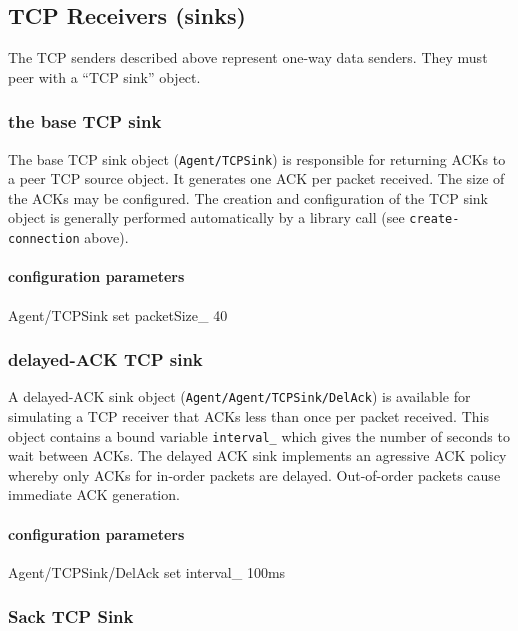 \documentclass{article}
\begin{document}
\subsection{TCP Receivers (sinks)}

The TCP senders described above represent one-way data senders.
They must peer with a ``TCP sink'' object.

\subsubsection{the base TCP sink}

The base TCP sink object ({\tt Agent/TCPSink})
is responsible for returning ACKs to
a peer TCP source object.
It generates one ACK per packet received.
The size of the ACKs may be configured.
The creation and configuration of the TCP sink object
is generally performed automatically by a library
call (see {\tt create-connection} above).

\paragraph{configuration parameters}
\begin{program}
Agent/TCPSink set packetSize_ 40
\end{program}

\subsubsection{delayed-ACK TCP sink}

A delayed-ACK sink object ({\tt Agent/Agent/TCPSink/DelAck}) is available
for simulating a TCP receiver that ACKs less than once per packet received.
This object contains a bound variable {\tt interval\_} which gives the
number of seconds to wait between ACKs.
The delayed ACK sink implements an agressive ACK policy whereby
only ACKs for in-order packets are delayed.
Out-of-order packets cause immediate ACK generation.

\paragraph{configuration parameters}
\begin{program}
Agent/TCPSink/DelAck set interval_ 100ms
\end{program}

\subsubsection{Sack TCP Sink}
\end{document}
